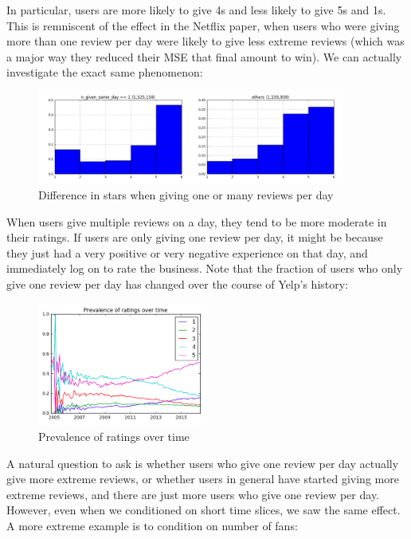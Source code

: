 \documentclass[11pt]{article}
\begin{document}
In particular, users are more likely to give 4s and less likely to give 5s and 1s. This is remniscent of the effect in the Netflix paper, when users who were giving more than one review per day were likely to give less extreme reviews (which was a major way they reduced their MSE that final amount to win). We can actually investigate the exact same phenomenon:

\begin{figure}[H]
\centering
\includegraphics[width=0.9\textwidth]{./ac209/more-than-one-per-day-dist.png}
\caption{Difference in stars when giving one or many reviews per day}
\end{figure}

When users give multiple reviews on a day, they tend to be more moderate in their ratings. If users are only giving one review per day, it might be because they just had a very positive or very negative experience on that day, and immediately log on to rate the business. Note that the fraction of users who only give one review per day has changed over the course of Yelp's history:

\begin{figure}[H]
\centering
\includegraphics[width=0.5\textwidth]{./ac209/prevalenceofratingsovertime.png}
\caption{Prevalence of ratings over time}
\end{figure}

A natural question to ask is whether users who give one review per day actually give more extreme reviews, or whether users in general have started giving more extreme reviews, and there are just more users who give one review per day. However, even when we conditioned on short time slices, we saw the same effect. A more extreme example is to condition on number of fans:
\end{document}

